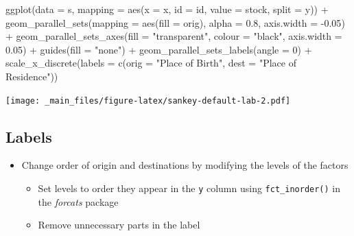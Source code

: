 \documentclass[
]{book}
\newenvironment{Shaded}{\begin{snugshade}}{\end{snugshade}}
\newcommand{\AttributeTok}[1]{\textcolor[rgb]{0.77,0.63,0.00}{#1}}
\newcommand{\DecValTok}[1]{\textcolor[rgb]{0.00,0.00,0.81}{#1}}
\newcommand{\FloatTok}[1]{\textcolor[rgb]{0.00,0.00,0.81}{#1}}
\newcommand{\FunctionTok}[1]{\textcolor[rgb]{0.00,0.00,0.00}{#1}}
\newcommand{\NormalTok}[1]{#1}
\newcommand{\SpecialCharTok}[1]{\textcolor[rgb]{0.00,0.00,0.00}{#1}}
\newcommand{\StringTok}[1]{\textcolor[rgb]{0.31,0.60,0.02}{#1}}
\providecommand{\tightlist}{%
  \setlength{\itemsep}{0pt}\setlength{\parskip}{0pt}}
\begin{document}
\begin{Shaded}
\begin{Highlighting}[]
\FunctionTok{ggplot}\NormalTok{(}\AttributeTok{data =}\NormalTok{ s, }\AttributeTok{mapping =} \FunctionTok{aes}\NormalTok{(}\AttributeTok{x =}\NormalTok{ x, }\AttributeTok{id =}\NormalTok{ id, }\AttributeTok{value =}\NormalTok{ stock, }\AttributeTok{split =}\NormalTok{ y)) }\SpecialCharTok{+}
  \FunctionTok{geom\_parallel\_sets}\NormalTok{(}\AttributeTok{mapping =} \FunctionTok{aes}\NormalTok{(}\AttributeTok{fill =}\NormalTok{ orig), }\AttributeTok{alpha =} \FloatTok{0.8}\NormalTok{, }\AttributeTok{axis.width =} \SpecialCharTok{{-}}\FloatTok{0.05}\NormalTok{) }\SpecialCharTok{+}
  \FunctionTok{geom\_parallel\_sets\_axes}\NormalTok{(}\AttributeTok{fill =} \StringTok{"transparent"}\NormalTok{, }\AttributeTok{colour =} \StringTok{"black"}\NormalTok{, }
                          \AttributeTok{axis.width =} \FloatTok{0.05}\NormalTok{) }\SpecialCharTok{+}
  \FunctionTok{guides}\NormalTok{(}\AttributeTok{fill =} \StringTok{"none"}\NormalTok{) }\SpecialCharTok{+}
  \FunctionTok{geom\_parallel\_sets\_labels}\NormalTok{(}\AttributeTok{angle =} \DecValTok{0}\NormalTok{) }\SpecialCharTok{+}
  \FunctionTok{scale\_x\_discrete}\NormalTok{(}\AttributeTok{labels =} \FunctionTok{c}\NormalTok{(}\AttributeTok{orig =} \StringTok{"Place of Birth"}\NormalTok{, }
                              \AttributeTok{dest =} \StringTok{"Place of Residence"}\NormalTok{))}
\end{Highlighting}
\end{Shaded}

\texttt{[image: \_main\_files/figure-latex/sankey-default-lab-2.pdf]}

\hypertarget{labels-8}{%
\subsection{Labels}\label{labels-8}}

\begin{itemize}
\tightlist
\item
  Change order of origin and destinations by modifying the levels of the factors

  \begin{itemize}
  \tightlist
  \item
    Set levels to order they appear in the \texttt{y} column using \texttt{fct\_inorder()} in the \emph{forcats} package
  \item
    Remove unnecessary parts in the label
  \end{itemize}
\end{itemize}
\end{document}

